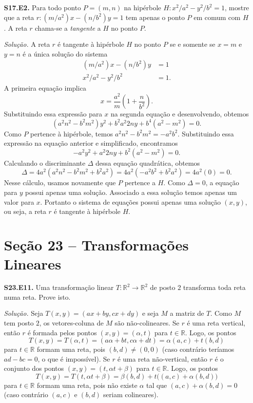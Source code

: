 \documentclass[a4paper,11pt]{article}
\newcommand{\R}{\mathbb{R}}
\begin{document}
\textbf{S17.E2.}
Para todo ponto $P = (m,n)$ na hipérbole $H : x^2/a^2 - y^2/b^2 = 1$, mostre que a reta $r: (m/a^2)x - (n/b^2)y = 1$ tem apenas o ponto $P$ em comum com $H$.
A reta $r$ chama-se a \emph{tangente} a $H$ no ponto $P$.

\vspace{\baselineskip}

\emph{Solução.}
A reta $r$ é tangente à hipérbole $H$ no ponto $P$ se e somente se $x = m$ e $y = n$ é a única solução do sistema
\begin{align*}
  (m/a^2) x - (n/b^2) y & = 1 \\
  x^2/a^2 - y^2/b^2 & = 1.
\end{align*}
A primeira equação implica
\[
  x = \frac{a^2}{m} \left( 1 + \frac{n}{b^2} \right).
\]
Substituindo essa expressão para $x$ na segunda equação e desenvolvendo, obtemos
\[
  (a^2 n^2 - b^2 m^2) y^2 + b^2 a^2 2ny + b^4(a^2 - m^2) = 0.
\]
Como $P$ pertence à hipérbole, temos $a^2 n^2 - b^2 m^2 = -a^2 b^2$.
Substituindo essa expressão na equação anterior e simplificado, encontramos
\[
  -a^2 y^2 + a^2 2ny + b^2 (a^2 - m^2) = 0.
\]
Calculando o discriminante $\Delta$ dessa equação quadrática, obtemos
\[
  \Delta = 4 a^2 ( a^2 n^2 - b^2 m^2 + b^2 a^2 ) = 4 a^2 (-a^2 b^2 + b^2 a^2 ) = 4 a^2 (0) = 0.
\]
Nesse cálculo, usamos novamente que $P$ pertence a $H$.
Como $\Delta = 0$, a equação para $y$ possui apenas uma solução.
Associado a essa solução temos apenas um valor para $x$.
Portanto o sistema de equações possui apenas uma solução $(x,y)$, ou seja, a reta $r$ é tangente à hipérbole $H$.

\section*{Seção 23 -- Transformações Lineares}

\textbf{S23.E11.}
Uma transformação linear $T : \R^2 \to \R^2$ de posto $2$ transforma toda reta numa reta.
Prove isto.

\vspace{\baselineskip}

\emph{Solução.}
Seja $T(x,y) = (ax + by, cx + dy)$ e seja $M$ a matriz de $T$.
Como $M$ tem posto $2$, os vetores-coluna de $M$ são não-colineares.
Se $r$ é uma reta vertical, então $r$ é formada pelos pontos $(x,y) = (\alpha,t)$ para $t \in \R$.
Logo, os pontos
\[
  T(x,y) = T(\alpha, t) = (a \alpha + bt, c \alpha + dt) = \alpha(a, c) + t(b,d)
\]
para $t \in \R$ formam uma reta, pois $(b,d) \neq (0,0)$ (caso contrário teríamos $ad - bc = 0$, o que é impossível).
Se $r$ é uma reta não-vertical, então $r$ é o conjunto dos pontos $(x,y) = (t, \alpha t + \beta)$ para $t \in \R$.
Logo, os pontos
\[
  T(x,y) = T(t, \alpha t + \beta) = \beta(b,d) + t \big( (a,c) + \alpha (b,d) \big)
\]
para $t \in \R$ formam uma reta, pois não existe $\alpha$ tal que $(a,c) + \alpha(b,d) = 0$ (caso contrário $(a,c)$ e $(b,d)$ seriam colineares).
\end{document}
